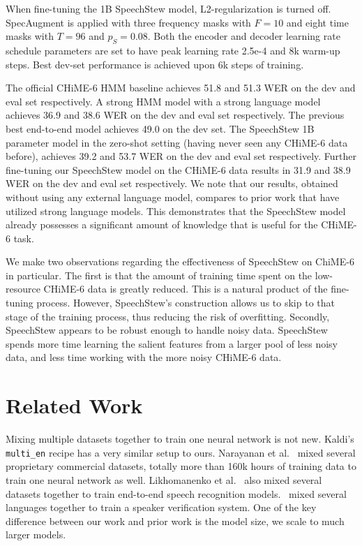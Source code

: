 \documentclass[a4paper]{article}
\begin{document}
When fine-tuning the 1B SpeechStew model, L2-regularization is turned off. SpecAugment is applied with three frequency masks with $F=10$ and eight time masks with $T=96$ and $p_S=0.08$. Both the encoder and decoder learning rate schedule parameters are set to have peak learning rate 2.5e-4 and 8k warm-up steps. Best dev-set performance is achieved upon 6k steps of training.

The official CHiME-6 HMM baseline \cite{watanabe-arxiv-2020} achieves 51.8 and 51.3 WER on the dev and eval set respectively. A strong HMM model with a strong language model \cite{medennikov-chime-2020} achieves 36.9 and 38.6 WER on the dev and eval set respectively. The previous best end-to-end model \cite{andrusenko-arxiv-2020} achieves 49.0 on the dev set. The SpeechStew 1B parameter model in the zero-shot setting (having never seen any CHiME-6 data before), achieves 39.2 and 53.7 WER on the dev and eval set respectively. Further fine-tuning our SpeechStew model on the CHiME-6 data results in 31.9 and 38.9 WER on the dev and eval set respectively. We note that our results, obtained without using any external language model, compares to prior work that have utilized strong language models. This demonstrates that the SpeechStew model already possesses a significant amount of knowledge that is useful for the CHiME-6 task.

We make two observations regarding the effectiveness of SpeechStew on ChiME-6 in particular. The first is that the amount of training time spent on the low-resource CHiME-6 data is greatly reduced. This is a natural product of the fine-tuning process. However, SpeechStew's construction allows us to skip to that stage of the training process, thus reducing the risk of overfitting. Secondly, SpeechStew appears to be robust enough to handle noisy data. SpeechStew spends more time learning the salient features from a larger pool of less noisy data, and less time working with the more noisy CHiME-6 data.


\section{Related Work}
Mixing multiple datasets together to train one neural network is not new. Kaldi's \texttt{multi\_en} recipe \cite{kaldi-multi-en} has a very similar setup to ours. Narayanan et al.~\cite{narayanan-slt-2018} mixed several proprietary commercial datasets, totally more than 160k hours of training data to train one neural network as well. Likhomanenko et al.~\cite{likhomanenko-arxiv-2020} also mixed several datasets together to train end-to-end speech recognition models.~\cite{chojnacka-arxiv-2021} mixed several languages together to train a speaker verification system. One of the key difference between our work and prior work is the model size, we scale to much larger models.
\end{document}
